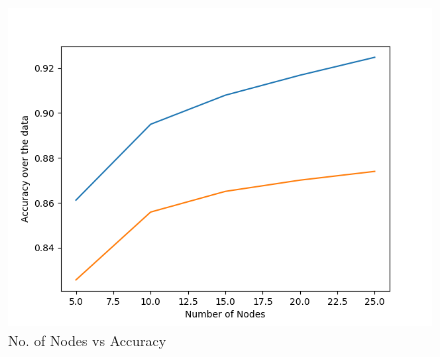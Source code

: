 \documentclass[11pt]{article}
\begin{document}
\begin{figure}[H]
  \includegraphics[width=\linewidth]{nn_c_plot.png}
  \caption{No. of Nodes vs Accuracy}
  \label{fig1B}
\end{figure}
\\
\end{document}
